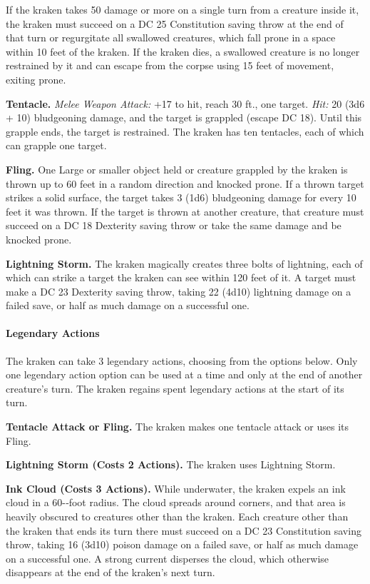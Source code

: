 \documentclass[
]{article}
\begin{document}
If the kraken takes 50 damage or more on a single turn from a creature
inside it, the kraken must succeed on a DC 25 Constitution saving throw
at the end of that turn or regurgitate all swallowed creatures, which
fall prone in a space within 10 feet of the kraken. If the kraken dies,
a swallowed creature is no longer restrained by it and can escape from
the corpse using 15 feet of movement, exiting prone.

\textbf{Tentacle.} \emph{Melee Weapon Attack:} +17 to hit, reach 30 ft.,
one target. \emph{Hit:} 20 (3d6 + 10) bludgeoning damage, and the target
is grappled (escape DC 18). Until this grapple ends, the target is
restrained. The kraken has ten tentacles, each of which can grapple one
target.

\textbf{Fling.} One Large or smaller object held or creature grappled by
the kraken is thrown up to 60 feet in a random direction and knocked
prone. If a thrown target strikes a solid surface, the target takes 3
(1d6) bludgeoning damage for every 10 feet it was thrown. If the target
is thrown at another creature, that creature must succeed on a DC 18
Dexterity saving throw or take the same damage and be knocked prone.

\textbf{Lightning Storm.} The kraken magically creates three bolts of
lightning, each of which can strike a target the kraken can see within
120 feet of it. A target must make a DC 23 Dexterity saving throw,
taking 22 (4d10) lightning damage on a failed save, or half as much
damage on a successful one.

\hypertarget{legendary-actions}{%
\paragraph{Legendary Actions}\label{legendary-actions}}

The kraken can take 3 legendary actions, choosing from the options
below. Only one legendary action option can be used at a time and only
at the end of another creature's turn. The kraken regains spent
legendary actions at the start of its turn.

\textbf{Tentacle Attack or Fling.} The kraken makes one tentacle attack
or uses its Fling.

\textbf{Lightning Storm (Costs 2 Actions).} The kraken uses Lightning
Storm.

\textbf{Ink Cloud (Costs 3 Actions).} While underwater, the kraken
expels an ink cloud in a 60-­‐foot radius. The cloud spreads around
corners, and that area is heavily obscured to creatures other than the
kraken. Each creature other than the kraken that ends its turn there
must succeed on a DC 23 Constitution saving throw, taking 16 (3d10)
poison damage on a failed save, or half as much damage on a successful
one. A strong current disperses the cloud, which otherwise disappears at
the end of the kraken's next turn.
\end{document}
